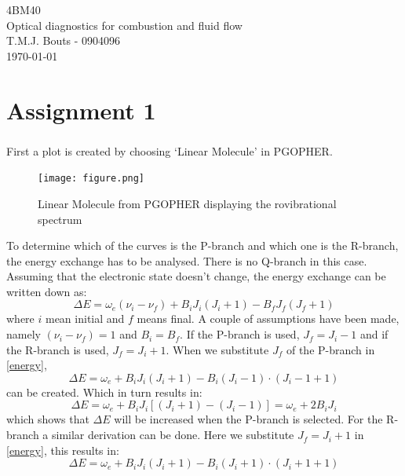 

\setcounter{page}{1}
\vspace*{-2.5cm}
\begin{center}
\large{\textsf{4BM40 \\
Optical diagnostics for combustion and fluid flow \\
T.M.J. Bouts - 0904096\\
\today}}
\section*{Assignment 1}
\setcounter{section}{1}
\setcounter{subsection}{1}
\end{center}
\subsubsection{}
First a plot is created by choosing `Linear Molecule' in PGOPHER.
\begin{figure}[H] 
\centering
\texttt{[image: figure.png]}
\caption{Linear Molecule from PGOPHER displaying the rovibrational spectrum}
\label{Figure}
\end{figure}
To determine which of the curves is the P-branch and which one is the R-branch, the energy exchange has to be analysed. There is no Q-branch in this case. Assuming that the electronic state doesn't change, the energy exchange can be written down as:
\begin{equation} \label{energy}
	\Delta E = \omega_e \left(\nu_i - \nu_f \right)+B_i J_i (J_i +1)-B_f J_f (J_f +1)
\end{equation}
where $i$ mean initial and $f$ means final. A couple of assumptions have been made, namely $\left(\nu_i - \nu_f \right) = 1$ and $B_i = B_f$. If the P-branch is used, $J_f = J_i -1$ and if the R-branch is used, $J_f = J_i +1$. When we substitute $J_f$ of the P-branch in \eqref{energy}, 
\begin{equation}
	\Delta E = \omega_e +B_i J_i (J_i +1)-B_i (J_i -1) \cdot (J_i -1 +1) 
\end{equation}
can be created. Which in turn results in:
\begin{equation}
	\Delta E = \omega_e +B_i J_i \left[ (J_i +1)-(J_i -1) \right] = \omega_e +2 B_i J_i
\end{equation}
which shows that $\Delta E$ will be increased when the P-branch is selected. For the R-branch a similar derivation can be done. Here we substitute $J_f = J_i + 1$ in \eqref{energy}, this results in:
\begin{equation}
	\Delta E = \omega_e +B_i J_i (J_i +1)-B_i (J_i + 1) \cdot (J_i + 1 +1)
\end{equation}
